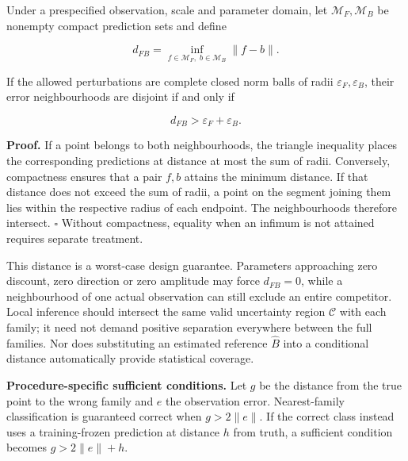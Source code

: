\documentclass[11pt,a4paper]{article}
\begin{document}
\par
\noindent\begin{minipage}{\linewidth}

Under a prespecified observation, scale and parameter domain, let
\(\mathcal M_F,\mathcal M_B\) be nonempty compact prediction sets and
define

\[
d_{FB}=\inf_{f\in\mathcal M_F,\;b\in\mathcal M_B}\|f-b\|.
\]

\end{minipage}\par

\par
\noindent\begin{minipage}{\linewidth}

If the allowed perturbations are complete closed norm balls of radii
\(\varepsilon_F,\varepsilon_B\), their error neighbourhoods are disjoint
if and only if

\[
d_{FB}>\varepsilon_F+\varepsilon_B.
\]

\end{minipage}\par

\textbf{Proof.} If a point belongs to both neighbourhoods, the triangle
inequality places the corresponding predictions at distance at most the
sum of radii. Conversely, compactness ensures that a pair \(f,b\)
attains the minimum distance. If that distance does not exceed the sum
of radii, a point on the segment joining them lies within the respective
radius of each endpoint. The neighbourhoods therefore intersect.
\(\square\) Without compactness, equality when an infimum is not
attained requires separate treatment.

This distance is a worst-case design guarantee. Parameters approaching
zero discount, zero direction or zero amplitude may force \(d_{FB}=0\),
while a neighbourhood of one actual observation can still exclude an
entire competitor. Local inference should intersect the same valid
uncertainty region \(\mathcal C\) with each family; it need not demand
positive separation everywhere between the full families. Nor does
substituting an estimated reference \(\widehat B\) into a conditional
distance automatically provide statistical coverage.

\textbf{Procedure-specific sufficient conditions.} Let \(g\) be the
distance from the true point to the wrong family and \(e\) the
observation error. Nearest-family classification is guaranteed correct
when \(g>2\|e\|\). If the correct class instead uses a training-frozen
prediction at distance \(h\) from truth, a sufficient condition becomes
\(g>2\|e\|+h\).
\end{document}
